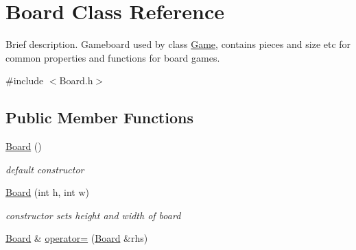 \hypertarget{class_board}{\section{Board Class Reference}
\label{class_board}
}


Brief description. Gameboard used by class \hyperlink{class_game}{Game}, contains pieces and size etc for common properties and functions for board games.  




{\ttfamily \#include $<$Board.\-h$>$}

\subsection*{Public Member Functions}
\begin{DoxyCompactItemize}
\item 
\hypertarget{class_board_a9ee491d4fea680cf69b033374a9fdfcb}{\hyperlink{class_board_a9ee491d4fea680cf69b033374a9fdfcb}{Board} ()}\label{class_board_a9ee491d4fea680cf69b033374a9fdfcb}

\begin{DoxyCompactList}\small\item\em default constructor \end{DoxyCompactList}\item 
\hyperlink{class_board_a2a454606767ae96c22a728f3268b10fc}{Board} (int h, int w)
\begin{DoxyCompactList}\small\item\em constructor sets height and width of board \end{DoxyCompactList}\item 
\hypertarget{class_board_abe6ef93a03902a234b541130dab81366}{\hyperlink{class_board}{Board} \& \hyperlink{class_board_abe6ef93a03902a234b541130dab81366}{operator=} (\hyperlink{class_board}{Board} \&rhs)}\label{class_board_abe6ef93a03902a234b541130dab81366}


\end{DoxyCompactItemize}
